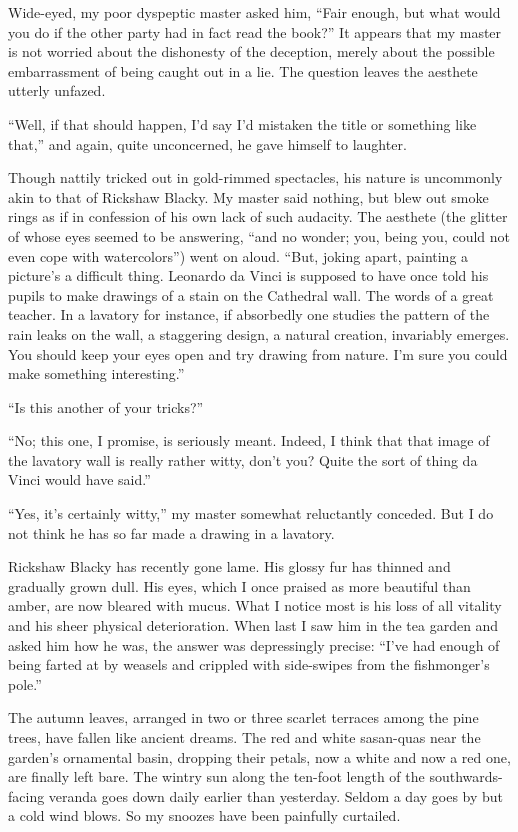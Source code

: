 \documentclass[12pt, openright]{book}
\begin{document}
Wide-eyed, my poor dyspeptic master asked him, ``Fair e\-nough, but what
would you do if the other party had in fact read the book?'' It appears
that my master is not worried about the dishonesty of the deception,
merely about the possible embarrassment of being caught out in a lie.
The question leaves the aesthete utterly unfazed.

``Well, if that should happen, I'd say I'd mistaken the title or
something like that,'' and again, quite unconcerned, he gave himself to
laughter.

Though nattily tricked out in gold-rimmed spectacles, his nature is
uncommonly akin to that of Rickshaw Blacky. My master said nothing, but
blew out smoke rings as if in confession of his own lack of such
audacity. The aesthete (the glitter of whose eyes seemed to be
answering, ``and no wonder; you, being you, could not even cope with
watercolors'') went on aloud. ``But, joking apart, painting a picture's
a difficult thing. Leonardo da Vinci is supposed to have once told his
pupils to make drawings of a stain on the Cathedral wall. The words of a
great teacher. In a lavatory for instance, if absorbedly one studies the
pattern of the rain leaks on the wall, a staggering design, a natural
creation, invariably emerges. You should keep your eyes open and try
drawing from nature. I'm sure you could make something interesting.''

``Is this another of your tricks?''

``No; this one, I promise, is seriously meant. Indeed, I think that that
image of the lavatory wall is really rather witty, don't you? Quite the
sort of thing da Vinci would have said.''

``Yes, it's certainly witty,'' my master somewhat reluctantly conceded.
But I do not think he has so far made a drawing in a lavatory.

Rickshaw Blacky has recently gone lame. His glossy fur has thinned and
gradually grown dull. His eyes, which I once praised as more beautiful
than amber, are now bleared with mucus. What I notice most is his loss
of all vitality and his sheer physical deterioration. When last I saw
him in the tea garden and asked him how he was, the answer was
depressingly precise: ``I've had enough of being farted at by weasels
and crippled with side-swipes from the fishmonger's pole.''

The autumn leaves, arranged in two or three scarlet terraces among the
pine trees, have fallen like ancient dreams. The red and white
sasan-quas near the garden's ornamental basin, dropping their petals,
now a white and now a red one, are finally left bare. The wintry sun
along the ten-foot length of the southwards-facing veranda goes down
daily earlier than yesterday. Seldom a day goes by but a cold wind
blows. So my snoozes have been painfully curtailed.
\end{document}
